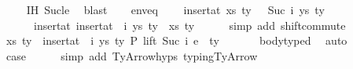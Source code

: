 \begin{isabellebody}
\ \ \ \isamarkupfalse%
\ IH\ Suc{\isacharunderscore}{\kern0pt}le\ \isamarkupfalse%
\ blast\isanewline
\isanewline
\ \ \isamarkupfalse%
\ env{\isacharunderscore}{\kern0pt}eq{\isacharcolon}{\kern0pt}\isanewline
\ \ \ \ {\isachardoublequoteopen}insert{\isacharunderscore}{\kern0pt}at\ {\isacharparenleft}{\kern0pt}{\isacharparenleft}{\kern0pt}xs{\isacharcomma}{\kern0pt}\ ty{}{\isacharparenright}{\kern0pt}\ {\isacharhash}{\kern0pt}\ {\isasymGamma}{\isacharparenright}{\kern0pt}\ {\isacharparenleft}{\kern0pt}Suc\ i{\isacharparenright}{\kern0pt}\ {\isacharparenleft}{\kern0pt}ys{\isacharcomma}{\kern0pt}\ ty{}{\isacharparenright}{\kern0pt}\isanewline
\ \ \ \ \ {\isacharequal}{\kern0pt}\ insert{\isacharunderscore}{\kern0pt}at\ {\isacharparenleft}{\kern0pt}insert{\isacharunderscore}{\kern0pt}at\ {\isasymGamma}\ i\ {\isacharparenleft}{\kern0pt}ys{\isacharcomma}{\kern0pt}\ ty{}{\isacharparenright}{\kern0pt}{\isacharparenright}{\kern0pt}\ {}\ {\isacharparenleft}{\kern0pt}xs{\isacharcomma}{\kern0pt}\ ty{}{\isacharparenright}{\kern0pt}{\isachardoublequoteclose}\isanewline
\ \ \ \ \isamarkupfalse%
\ {\isacharparenleft}{\kern0pt}simp\ add{\isacharcolon}{\kern0pt}\ shift{\isacharunderscore}{\kern0pt}commute{\isacharparenright}{\kern0pt}\isanewline
\isanewline
\ \ \isamarkupfalse%
\ {\isachardoublequoteopen}{\isacharparenleft}{\kern0pt}xs{\isacharcomma}{\kern0pt}\ ty{}{\isacharparenright}{\kern0pt}\ {\isacharhash}{\kern0pt}\ insert{\isacharunderscore}{\kern0pt}at\ {\isasymGamma}\ i\ {\isacharparenleft}{\kern0pt}ys{\isacharcomma}{\kern0pt}\ ty{}{\isacharparenright}{\kern0pt}\ {\isasymturnstile}{\isacharbraceleft}{\kern0pt}P{\isacharbraceright}{\kern0pt}\ lift\ {\isacharparenleft}{\kern0pt}Suc\ i{\isacharparenright}{\kern0pt}\ e\ {\isacharcolon}{\kern0pt}\ ty{}{\isacharprime}{\kern0pt}{\isachardoublequoteclose}\isanewline
\ \ \ \ \ \isamarkupfalse%
\ body{\isacharunderscore}{\kern0pt}typed\ \isamarkupfalse%
\ auto\isanewline
\isanewline
\ \ \isamarkupfalse%
\ \isamarkupfalse%
\ {\isacharquery}{\kern0pt}case\isanewline
\ \ \ \ \isamarkupfalse%
\ {\isacharparenleft}{\kern0pt}simp\ add{\isacharcolon}{\kern0pt}\ TyArrow{\isachardot}{\kern0pt}hyps{\isacharparenleft}{\kern0pt}{}{\isacharcomma}{\kern0pt}{}{\isacharparenright}{\kern0pt}\ typing{\isachardot}{\kern0pt}TyArrow{\isacharparenright}{\kern0pt}\isanewline

\end{isabellebody}
